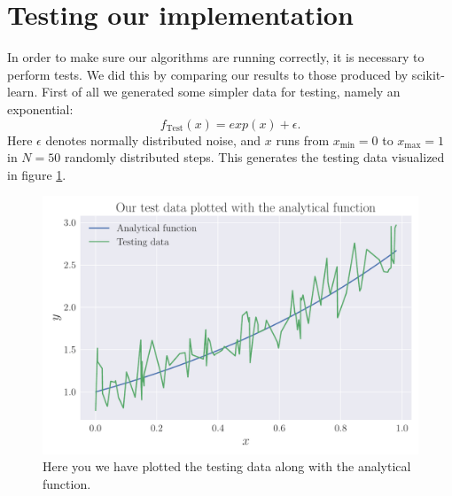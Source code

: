 \documentclass[reprint,english,notitlepage,aps,nobalancelastpage,nofootinbib]{revtex4-1}  %
\begin{document}
\section{Testing our implementation}\label{Apx:test}
In order to make sure our algorithms are running correctly, it is necessary to perform tests. We did this by comparing our results to those produced by scikit-learn. First of all we generated some simpler data for testing, namely an exponential:
\begin{equation}
\label{eq:exp}
f_\text{Test}(x) = exp(x) + \epsilon.
\end{equation}
Here $\epsilon$ denotes normally distributed noise, and $x$ runs from $x_\text{min} = 0$ to $x_\text{max} = 1$ in $N = 50$ randomly distributed steps. This generates the testing data visualized in figure \ref{fig:TestingData}.

\begin{figure}[H]
	\includegraphics[width=\linewidth]{Testing_data.pdf}
	\caption{Here you we have plotted the testing data along with the analytical function.}
	\label{fig:TestingData}
\end{figure}
\end{document}
